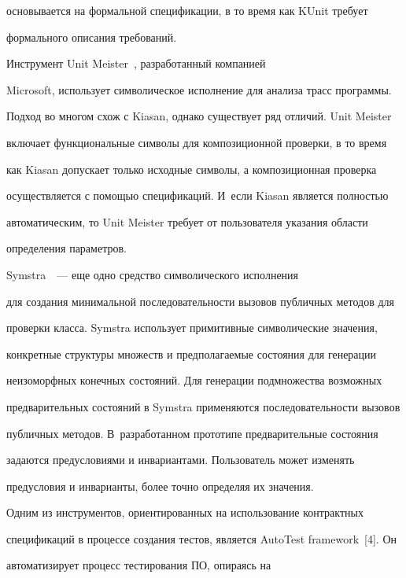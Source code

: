 основывается на формальной спецификации, в то время как KUnit требует


формального описания требований.





     Инструмент Unit Meister~\cite{10-andr}, разработанный компанией


Microsoft, использует символическое исполнение для анализа трасс программы.


Подход во многом схож с Kiasan, однако существует ряд отличий. Unit Meister


включает функциональные символы для композиционной проверки, в то время


как Kiasan допускает только исходные символы, а композиционная проверка


осуществляется с по\-мощью спецификаций. И~если Kiasan является полностью


автоматическим, то Unit Meister требует от пользователя указания области


определения параметров.





     Symstra~\cite{11-andr}~--- еще одно средство символического исполнения


для создания минимальной последовательности вызовов публичных методов для


проверки класса. Symstra использует примитивные символические значения,


конкретные структуры множеств и предполагаемые состояния для генерации


неизоморфных конечных состояний. Для генерации подмножества возможных


предварительных состояний в Symstra применяются последовательности вызовов


публичных методов. В~разработанном прототипе предварительные состояния


задаются пред\-усло\-ви\-ями и инвариантами. Пользователь может изменять


предусловия и инварианты, более точно определяя их значения.





Одним из инструментов, ориентированных на использование контрактных


спецификаций в процессе создания тес\-тов, является AutoTest framework~[4]. Он


автоматизирует процесс тестирования ПО, опираясь на


